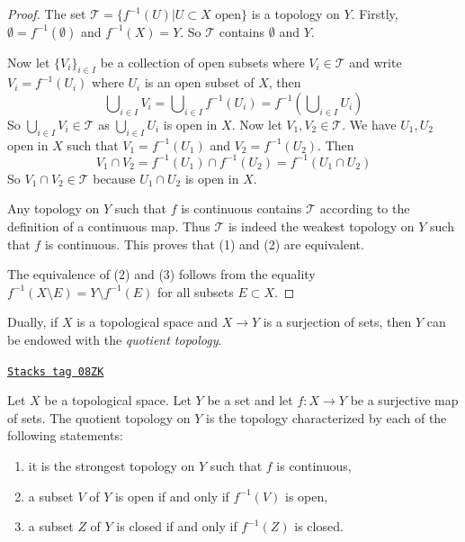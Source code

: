 \begin{proof}
The set $\mathcal{T} = \{f^{-1}(U) | U \subset X \text{ open}\}$ is a
topology on $Y$. Firstly, $\emptyset = f^{-1}(\emptyset)$ and $f^{-1}(X) = Y$.
So $\mathcal{T}$ contains $\emptyset$ and $Y$.

\medskip\noindent
Now let $\{V_i\}_{i \in I}$ be a collection of open subsets where
$V_i \in \mathcal{T}$ and write $V_i = f^{-1}(U_i)$ where $U_i$
is an open subset of $X$, then
$$
\bigcup\nolimits_{i\in I} V_i =
\bigcup\nolimits_{i\in I} f^{-1}(U_i) =
f^{-1}\left(\bigcup\nolimits_{i\in I} U_i\right)
$$
So $\bigcup_{i\in I} V_i \in \mathcal{T}$ as $\bigcup_{i\in I} U_i$
is open in $X$.
Now let $V_1, V_2 \in \mathcal{T}$. We have $U_1, U_2$ open in $X$
such that $V_1 = f^{-1}(U_1)$ and $V_2 = f^{-1}(U_2)$. Then
$$
V_1 \cap V_2 = f^{-1}(U_1) \cap f^{-1}(U_2) = f^{-1}(U_1 \cap U_2)
$$
So $V_1 \cap V_2 \in \mathcal{T}$ because $U_1 \cap U_2$ is open in $X$.

\medskip\noindent
Any topology on $Y$ such that $f$ is continuous contains
$\mathcal{T}$ according to the definition of a continuous map.
Thus $\mathcal{T}$ is indeed
the weakest topology on $Y$ such that $f$ is continuous.
This proves that (1) and (2) are equivalent.

\medskip\noindent
The equivalence of (2) and (3) follows from the equality
$f^{-1}(X \setminus E) = Y \setminus f^{-1}(E)$ for all subsets
$E \subset X$.
\end{proof}

Dually, if $X$ is a topological space and $X \to Y$ is a surjection of
sets, then $Y$ can be endowed with the {\it quotient topology}.

\begin{lemma}[Quotient]
\label{topology-lemma-quotient}
\href{https://stacks.math.columbia.edu/tag/08ZK}{\texttt{Stacks tag 08ZK}}

Let $X$ be a topological space. Let $Y$ be a set and let $f : X \to Y$
be a surjective map of sets. The quotient topology on $Y$ is the
topology characterized by each of the following statements:
\begin{enumerate}
\item it is the strongest topology on $Y$ such that $f$ is continuous,
\item a subset $V$ of $Y$ is open if and only if $f^{-1}(V)$ is open,
\item a subset $Z$ of $Y$ is closed if and only if $f^{-1}(Z)$ is closed.
\end{enumerate}
\end{lemma}

